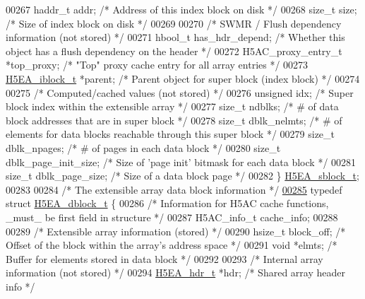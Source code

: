 \begin{DoxyCode}
00267     haddr\_t     addr;           \textcolor{comment}{/* Address of this index block on disk          */}
00268     \textcolor{keywordtype}{size\_t}      size;           \textcolor{comment}{/* Size of index block on disk                  */}
00269 
00270     \textcolor{comment}{/* SWMR / Flush dependency information (not stored) */}
00271     hbool\_t     has\_hdr\_depend; \textcolor{comment}{/* Whether this object has a flush dependency on the header */}
00272     H5AC\_proxy\_entry\_t *top\_proxy;      \textcolor{comment}{/* "Top" proxy cache entry for all array entries */}
00273     \hyperlink{struct_h5_e_a__iblock__t}{H5EA\_iblock\_t} *parent;      \textcolor{comment}{/* Parent object for super block (index block)  */}
00274 
00275     \textcolor{comment}{/* Computed/cached values (not stored) */}
00276     \textcolor{keywordtype}{unsigned}    idx;            \textcolor{comment}{/* Super block index within the extensible array */}
00277     \textcolor{keywordtype}{size\_t}      ndblks;         \textcolor{comment}{/* # of data block addresses that are in super block */}
00278     \textcolor{keywordtype}{size\_t}      dblk\_nelmts;    \textcolor{comment}{/* # of elements for data blocks reachable through this super block */}
00279     \textcolor{keywordtype}{size\_t}      dblk\_npages;    \textcolor{comment}{/* # of pages in each data block */}
00280     \textcolor{keywordtype}{size\_t}      dblk\_page\_init\_size;    \textcolor{comment}{/* Size of 'page init' bitmask for each data block */}
00281     \textcolor{keywordtype}{size\_t}      dblk\_page\_size; \textcolor{comment}{/* Size of a data block page */}
00282 \} \hyperlink{struct_h5_e_a__sblock__t}{H5EA\_sblock\_t};
00283 
00284 \textcolor{comment}{/* The extensible array data block information */}
\hyperlink{struct_h5_e_a__dblock__t}{00285} \textcolor{keyword}{typedef} \textcolor{keyword}{struct }\hyperlink{struct_h5_e_a__dblock__t}{H5EA\_dblock\_t} \{
00286     \textcolor{comment}{/* Information for H5AC cache functions, \_must\_ be first field in structure */}
00287     H5AC\_info\_t cache\_info;
00288 
00289     \textcolor{comment}{/* Extensible array information (stored) */}
00290     hsize\_t     block\_off;      \textcolor{comment}{/* Offset of the block within the array's address space */}
00291     \textcolor{keywordtype}{void}        *elmts;         \textcolor{comment}{/* Buffer for elements stored in data block  */}
00292 
00293     \textcolor{comment}{/* Internal array information (not stored) */}
00294     \hyperlink{struct_h5_e_a__hdr__t}{H5EA\_hdr\_t}  *hdr;           \textcolor{comment}{/* Shared array header info                             */}

\end{DoxyCode}
